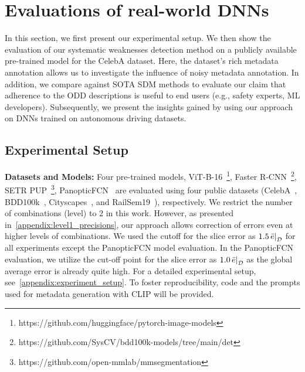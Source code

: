 \section{Evaluations of real-world DNNs}
\label{sec:results}

In this section, we first present our experimental setup. We then show the evaluation of our systematic weaknesses detection method on a publicly available pre-trained model for the CelebA dataset. 
Here, the dataset's rich metadata annotation allows us to investigate the influence of noisy metadata annotation. In addition, we
compare against SOTA SDM methods to evaluate our claim that adherence to the ODD descriptions is useful to end users (e.g., safety experts, ML developers). Subsequently, we present the insights gained by using our approach on DNNs trained on autonomous driving datasets.



\subsection{Experimental Setup}
\textbf{Datasets and Models:} Four pre-trained models, ViT-B-16~\citep{dosovitskiy2020image}\footnote{https://github.com/huggingface/pytorch-image-models}, Faster R-CNN~\citep{ren2015faster}\footnote{https://github.com/SysCV/bdd100k-models/tree/main/det}, SETR PUP~\citep{zheng2021rethinking}\footnote{https://github.com/open-mmlab/mmsegmentation}, PanopticFCN~\citep{li2021fully} are evaluated using four public datasets (CelebA~\citep{liu2015faceattributes}, BDD100k~\citep{yu2020bdd100k}, Cityscapes~\citep{cordts2016cityscapes}, and RailSem19~\citep{Zendel_2019_CVPR_Workshops}), respectively. 
We restrict the number of combinations (level) to 2 in this work. However, as presented in~\cref{appendix:level1_precisions}, our approach allows correction of errors even at higher levels of combinations. We used the cutoff for the slice error as $1.5 \, \restr{\bar{e}}{\mathcal D}$ for all experiments except the PanopticFCN model evaluation. In the PanopticFCN evaluation, we utilize the cut-off point for the slice error as $1.0 \, \restr{\bar{e}}{\mathcal D}$ as the global average error is already quite high. For a detailed experimental setup, see~\cref{appendix:experiment_setup}. To foster reproducibility, code and the prompts used for metadata generation with CLIP will be provided. 


